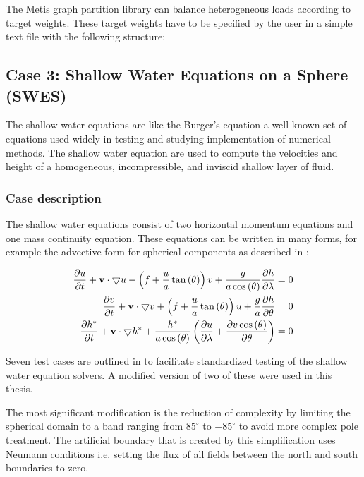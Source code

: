The Metis graph partition library can balance heterogeneous loads according to target weights.
These target weights have to be specified by the user in a simple text file with the following structure:



\newpage
\subsection{Case 3: Shallow Water Equations on a Sphere (SWES)}
The shallow water equations are like the Burger's equation a well known set of equations used widely in testing and studying implementation of numerical methods.
The shallow water equation are used to compute the velocities and height of a homogeneous, incompressible, and inviscid shallow layer of fluid.

\subsubsection{Case description}
The shallow water equations consist of two horizontal momentum equations and one mass continuity equation.
These equations can be written in many forms, for example the advective form for spherical components as described in \citet{williamson1992standard}:

\begin{equation}
\begin{split}
\frac{\partial u}{\partial t} + \mathbf{v} \cdot \bigtriangledown u - \left( f + \frac{u}{a} \tan \left( \theta \right) \right) v + \frac{g}{a \cos \left( \theta \right)} \frac{\partial h}{\partial \lambda} = 0 \\
\frac{\partial v}{\partial t} + \mathbf{v} \cdot \bigtriangledown v + \left( f + \frac{u}{a} \tan \left( \theta \right) \right) u + \frac{g}{a} \frac{\partial h}{\partial \theta} = 0  \\
\frac{\partial h^*}{\partial t} + \mathbf{v} \cdot \bigtriangledown h^* + \frac{h^*}{a \cos \left( \theta \right)} \left( \frac{\partial u}{\partial \lambda} + \frac{\partial v \cos \left( \theta \right)}{\partial \theta} \right) = 0 
\end{split}
\end{equation}

Seven test cases are outlined in \citet{williamson1992standard} to facilitate standardized testing of the shallow water equation solvers.
A modified version of two of these were used in this thesis.

The most significant modification is the reduction of complexity by limiting the spherical domain to a band ranging from $85^\circ$ to $-85^\circ$ to avoid more complex pole treatment.
The artificial boundary that is created by this simplification uses Neumann conditions i.e. setting the flux of all fields between the north and south boundaries to zero.




